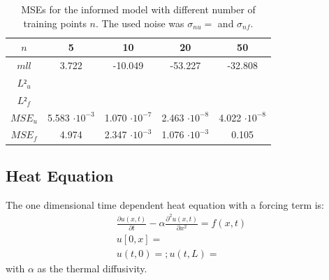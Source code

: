 \documentclass{article}
\begin{document}
\begin{table}[htbp!]
    \caption{MSEs for the informed model with different number of training points $n$. The used noise was $\sigma_{nu} = $ and $\sigma_{nf}$.}
    \centering
    \begin{tabular}{ccccc}
        \toprule
        $n$     & 5 & 10 & 20 & 50 \\
        \midrule
        $mll$ &   3.722&  -10.049  &   -53.227 &  -32.808 \\
        $L²_u$& & & & \\
        $L²_f$ & & & & \\
        $MSE_u$ & 5.583 $\cdot 10^{-3}$  &  1.070 $\cdot 10^{-7}$  &  2.463 $\cdot 10^{-8}$  &   4.022 $\cdot 10^{-8}$ \\
        $MSE_f$ &  4.974 & 2.347 $\cdot 10^{-3}$  & 1.076 $\cdot 10^{-3}$ &  0.105 \\
        \bottomrule
    \end{tabular}
    
    \label{tab:variing_n_trainingpoints}
\end{table}
\subsection{Heat Equation}
The one dimensional time dependent heat equation with a forcing term is:
\begin{equation}
    \begin{aligned}
        \frac{\partial u(x,t)}{\partial t} - \alpha \frac{\partial^2 u(x,t)}{\partial x^2} = f(x,t) \\ u[0,x] =\\ u(t,0) = ; u(t,L) =
    \end{aligned}
\end{equation}
with $\alpha$ as the thermal diffusivity.
\end{document}
